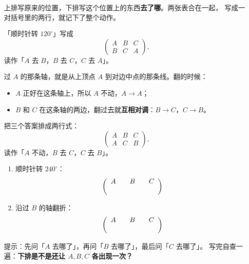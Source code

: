 \begin{definition}[置换的双行记号]
  上排写原来的位置，下排写这个位置上的东西\textbf{去了哪}。两张表合在一起，
  写成一对括号里的两行，就记下了整个动作。
\end{definition}

\begin{example}
  「顺时针转 \(120^\circ\)」写成
  \[
    \begin{pmatrix}
      A & B & C\\
      B & C & A
    \end{pmatrix},
  \]
  读作「\(A\) 去 \(B\)，\(B\) 去 \(C\)，\(C\) 去 \(A\)」。
\end{example}

\begin{example}
  过 \(A\) 的那条轴，就是从上顶点 \(A\) 到对边中点的那条线。翻的时候：
  \begin{itemize}
    \item \(A\) 正好在这条轴上，所以 \(A\) 不动，\(A\to A\)；
    \item \(B\) 和 \(C\) 在这条轴的两边，翻过去就\textbf{互相对调}：\(B\to C\)，\(C\to B\)。
  \end{itemize}
  把三个答案排成两行式：
  \[
    \begin{pmatrix}
      A & B & C\\
      A & C & B
    \end{pmatrix},
  \]
  读作「\(A\) 不动，\(B\) 去 \(C\)，\(C\) 去 \(B\)」。
\end{example}

\begin{dongshou}[跟做，写在下面]
  \begin{enumerate}
    \item 顺时针转 \(240^\circ\)：
      \[
        \begin{pmatrix}
          A & B & C\\[2pt]
          \hspace{1.8em} & \hspace{1.8em} & \hspace{1.8em}
        \end{pmatrix}
      \]
    \item 沿过 \(B\) 的轴翻折：
      \[
        \begin{pmatrix}
          A & B & C\\[2pt]
          \hspace{1.8em} & \hspace{1.8em} & \hspace{1.8em}
        \end{pmatrix}
      \]
  \end{enumerate}
  提示：先问「\(A\) 去哪了」，再问「\(B\) 去哪了」，最后问「\(C\) 去哪了」。
  写完自查一遍：\textbf{下排是不是还让 \(A,B,C\) 各出现一次？}
\end{dongshou}

